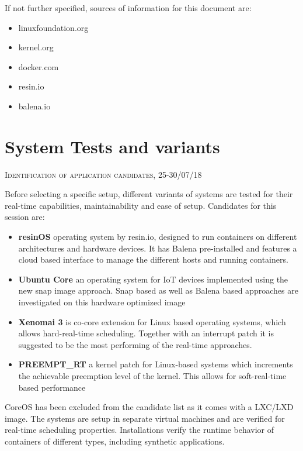 \documentclass[]{scrartcl}
\begin{document}
If not further specified, sources of information for this document are:
\begin{itemize}
	\item linuxfoundation.org
	\item kernel.org
	\item docker.com
	\item resin.io
	\item balena.io
\end{itemize}

\section{System Tests and variants}

{\small\textsc{Identification of application candidates, 25-30/07/18} \bigskip}

Before selecting a specific setup, different variants of systems are tested for their real-time capabilities, maintainability and ease of setup. Candidates for this session are:

\begin{itemize}
	\item \textbf{resinOS} operating system by resin.io, designed to run containers on different architectures and hardware devices. It has Balena pre-installed and features a cloud based interface to manage the different hosts and running containers.
	\item \textbf{Ubuntu Core} an operating system for IoT devices implemented using the new snap image approach. Snap based as well as Balena based approaches are investigated on this hardware optimized image
	\item \textbf{Xenomai 3} is co-core extension for Linux based operating systems, which allows hard-real-time scheduling. Together with an interrupt patch it is suggested to be the most performing of the real-time approaches.
	\item \textbf{PREEMPT\_RT} a kernel patch for Linux-based systems which increments the achievable preemption level of the kernel. This allows for soft-real-time based performance
\end{itemize}

CoreOS has been excluded from the candidate list as it comes with a LXC/LXD image. The systems are setup in separate virtual machines and are verified for real-time scheduling properties. Installations verify the runtime behavior of containers of different types, including synthetic applications.
\end{document}
